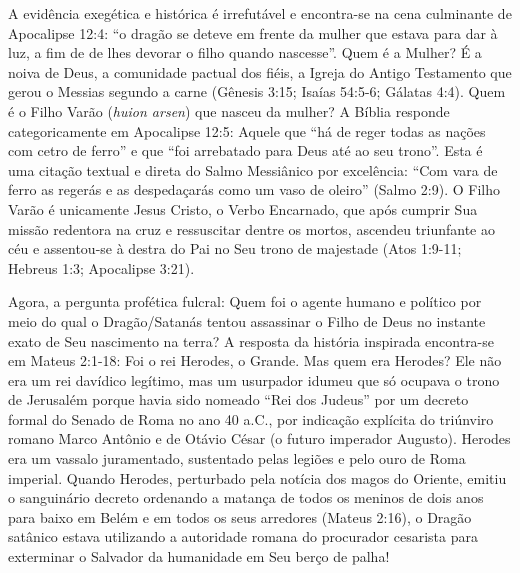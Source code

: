\documentclass[11pt,a4paper,openany]{book}
\begin{document}
A evidência exegética e histórica é irrefutável e encontra-se na cena culminante de Apocalipse 12:4: ``o dragão se deteve em frente da mulher que estava para dar à luz, a fim de de lhes devorar o filho quando nascesse''.
Quem é a Mulher? É a noiva de Deus, a comunidade pactual dos fiéis, a Igreja do Antigo Testamento que gerou o Messias segundo a carne (Gênesis 3:15; Isaías 54:5-6; Gálatas 4:4).
Quem é o Filho Varão (\textit{huion arsen}) que nasceu da mulher? A Bíblia responde categoricamente em Apocalipse 12:5: Aquele que ``há de reger todas as nações com cetro de ferro'' e que ``foi arrebatado para Deus até ao seu trono''. Esta é uma citação textual e direta do Salmo Messiânico por excelência: ``Com vara de ferro as regerás e as despedaçarás como um vaso de oleiro'' (Salmo 2:9). O Filho Varão é unicamente Jesus Cristo, o Verbo Encarnado, que após cumprir Sua missão redentora na cruz e ressuscitar dentre os mortos, ascendeu triunfante ao céu e assentou-se à destra do Pai no Seu trono de majestade (Atos 1:9-11; Hebreus 1:3; Apocalipse 3:21).

Agora, a pergunta profética fulcral: Quem foi o agente humano e político por meio do qual o Dragão/Satanás tentou assassinar o Filho de Deus no instante exato de Seu nascimento na terra?
A resposta da história inspirada encontra-se em Mateus 2:1-18: Foi o rei Herodes, o Grande. Mas quem era Herodes? Ele não era um rei davídico legítimo, mas um usurpador idumeu que só ocupava o trono de Jerusalém porque havia sido nomeado ``Rei dos Judeus'' por um decreto formal do Senado de Roma no ano 40 a.C., por indicação explícita do triúnviro romano Marco Antônio e de Otávio César (o futuro imperador Augusto). Herodes era um vassalo juramentado, sustentado pelas legiões e pelo ouro de Roma imperial. Quando Herodes, perturbado pela notícia dos magos do Oriente, emitiu o sanguinário decreto ordenando a matança de todos os meninos de dois anos para baixo em Belém e em todos os seus arredores (Mateus 2:16), o Dragão satânico estava utilizando a autoridade romana do procurador cesarista para exterminar o Salvador da humanidade em Seu berço de palha!
\end{document}
